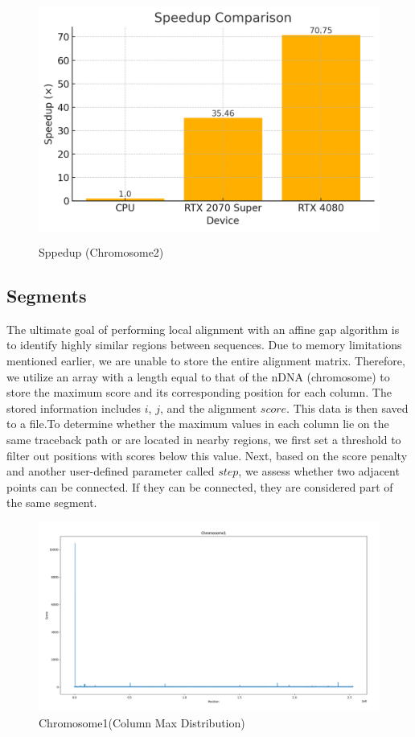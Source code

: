 \documentclass[PhD]{PHlab-thesis}
\begin{document}
\begin{figure}[htbp]
    \centering
    \includegraphics[height=8cm]{figures/Result2.png}
    \caption{Sppedup (Chromosome2)}
    \label{fig:result2}
\end{figure}
\subsection{Segments}
The ultimate goal of performing local alignment with an affine gap algorithm is to identify highly similar regions between sequences. Due to memory limitations mentioned earlier, we are unable to store the entire alignment matrix. Therefore, we utilize an array with a length equal to that of the nDNA (chromosome) to store the maximum score and its corresponding position for each column. The stored information includes $i$, $j$, and the alignment $score$. This data is then saved to a file.To determine whether the maximum values in each column lie on the same traceback path or are located in nearby regions, we first set a threshold to filter out positions with scores below this value. Next, based on the score penalty and another user-defined parameter called $step$, we assess whether two adjacent points can be connected. If they can be connected, they are considered part of the same segment.
\\
\begin{figure}[htbp]
    \centering
    \includegraphics[width=1\linewidth]{figures/chromosome1Distribution.png}
    \caption{Chromosome1(Column Max Distribution)}
    \label{fig:chromosome1Distribution}
\end{figure}
\end{document}
